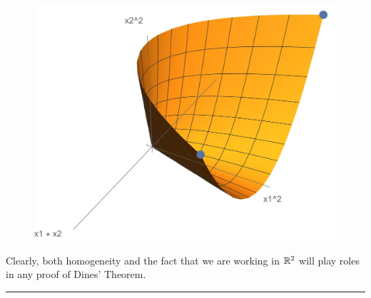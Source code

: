 \documentclass{article}
\begin{document}
\begin{figure}[htbp]
	\centering
	\includegraphics[width=\linewidth]{files/rank_one_matrices.jpg}
\end{figure}

Clearly, both homogeneity and the fact that we are working in ${\mathbb{R}}^2$ will play roles in any proof of Dines' Theorem.

\rule{0.5\linewidth}{\linethickness}
\end{document}
